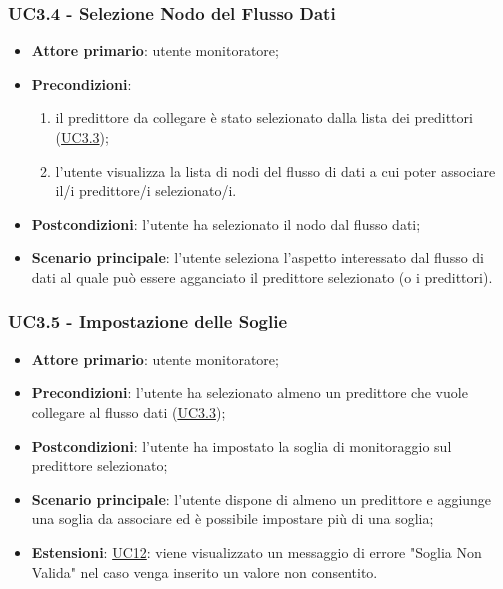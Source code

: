 	\label{par:UC3.4}
	\subsubsection{UC3.4 - Selezione Nodo del Flusso Dati}
		\begin{itemize}
			\item\textbf{Attore primario}: utente monitoratore;
			\item\textbf{Precondizioni}:
				\begin{enumerate}
					\item il predittore da collegare è stato selezionato dalla lista dei predittori (\hyperref[par:UC3.3]{UC3.3});
					\item l’utente visualizza la lista di nodi del flusso di dati a cui poter associare il/i predittore/i selezionato/i.
				\end{enumerate}
			\item\textbf{Postcondizioni}: l'utente ha selezionato il nodo dal flusso dati;
			\item\textbf{Scenario principale}: l’utente seleziona l’aspetto interessato dal flusso di dati al quale può essere agganciato il predittore selezionato (o i predittori).
		\end{itemize}

	\label{par:UC3.5}
	\subsubsection{UC3.5 - Impostazione delle Soglie}
		\begin{itemize}
			\item\textbf{Attore primario}: utente monitoratore;
			\item\textbf{Precondizioni}: l'utente ha selezionato almeno un predittore che vuole collegare al flusso dati (\hyperref[par:UC3.3]{UC3.3});
			\item\textbf{Postcondizioni}: l’utente ha impostato la soglia di monitoraggio sul predittore selezionato;
			\item\textbf{Scenario principale}: l’utente dispone di almeno un predittore e aggiunge una soglia da associare ed è possibile impostare più di una soglia;
			\item\textbf{Estensioni}: \hyperref[par:UC12]{UC12}: viene visualizzato un messaggio di errore "Soglia Non Valida" nel caso venga inserito un valore non consentito.
		\end{itemize}

	\label{par:UC3.6}
